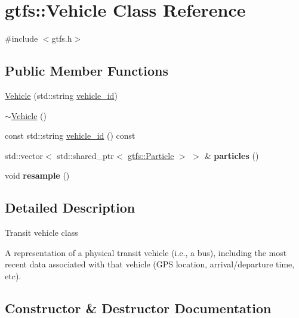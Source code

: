\hypertarget{classgtfs_1_1Vehicle}{}\section{gtfs\+:\+:Vehicle Class Reference}
\label{classgtfs_1_1Vehicle}


{\ttfamily \#include $<$gtfs.\+h$>$}

\subsection*{Public Member Functions}
\begin{DoxyCompactItemize}
\item 
\hyperlink{classgtfs_1_1Vehicle_a011c9c3353ce1686ff783a4342f67dfd}{Vehicle} (std\+::string \hyperlink{classgtfs_1_1Vehicle_ac05f908002380c7c2e735c1581ae4c5f}{vehicle\+\_\+id})
\item 
\hyperlink{classgtfs_1_1Vehicle_a08c7450dd0df9406f78b30be044d27d8}{$\sim$\+Vehicle} ()
\item 
const std\+::string \hyperlink{classgtfs_1_1Vehicle_ac05f908002380c7c2e735c1581ae4c5f}{vehicle\+\_\+id} () const 
\item 
std\+::vector$<$ std\+::shared\+\_\+ptr$<$ \hyperlink{classgtfs_1_1Particle}{gtfs\+::\+Particle} $>$ $>$ \& {\bfseries particles} ()\hypertarget{classgtfs_1_1Vehicle_aa74afb3da8d729fd383241f610514387}{}\label{classgtfs_1_1Vehicle_aa74afb3da8d729fd383241f610514387}

\item 
void {\bfseries resample} ()\hypertarget{classgtfs_1_1Vehicle_a46ee9775d11595461315be7141359d8a}{}\label{classgtfs_1_1Vehicle_a46ee9775d11595461315be7141359d8a}

\end{DoxyCompactItemize}


\subsection{Detailed Description}
Transit vehicle class

A representation of a physical transit vehicle (i.\+e., a bus), including the most recent data associated with that vehicle (G\+PS location, arrival/departure time, etc). 

\subsection{Constructor \& Destructor Documentation}
